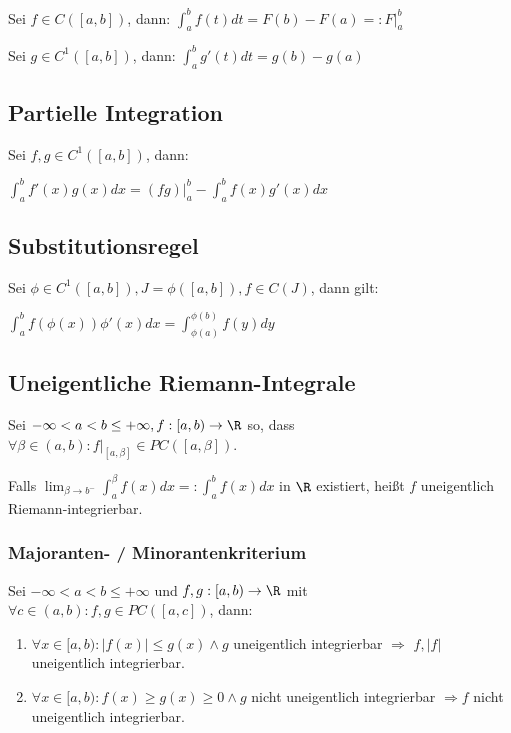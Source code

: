 Sei $f \in C([a, b])$, dann: $\int_a^b f(t) dt = F(b) - F(a) =: F|_a^b$

Sei $g \in C^1([a, b])$, dann: $\int_a^b g'(t) dt = g(b) - g(a)$

\subsection*{Partielle Integration}

Sei $f, g \in C^1([a, b])$, dann:

$\int_a^b f'(x)g(x) dx = (fg)|_a^b - \int_a^b f(x)g'(x) dx$

\subsection*{Substitutionsregel}

Sei $\phi \in C^1([a, b]), J = \phi([a,b]), f \in C(J)$, dann gilt:

$\int_a^b f(\phi(x))\phi'(x) dx = \int_{\phi(a)}^{\phi(b)} f(y) dy$

\subsection*{Uneigentliche Riemann-Integrale}

Sei $-\infty < a < b \leq +\infty, f : [a, b) \rightarrow \R$ so, dass $\forall \beta \in (a, b): f|_{[a, \beta]} \in PC([a, \beta])$.

Falls $\lim_{\beta \to b^-} \int_a^\beta f(x) dx =: \int_a^b f(x) dx$ in $\R$ existiert, heißt $f$ uneigentlich Riemann-integrierbar.

\subsubsection*{Majoranten- / Minorantenkriterium}

Sei $-\infty < a < b \leq +\infty$ und $f, g : [a, b) \to \R$ mit $\forall c \in (a, b) : f, g \in PC([a, c])$, dann:

\begin{enumerate}[label=(\alph*)]
	\item $\forall x \in [a, b) : |f(x)| \leq g(x) \land g$ uneigentlich integrierbar $\Rightarrow$ $f, |f|$ uneigentlich integrierbar.
	\item $\forall x \in [a, b): f(x) \geq g(x) \geq 0 \land g$ nicht uneigentlich integrierbar $\Rightarrow f$ nicht uneigentlich integrierbar.
\end{enumerate}

